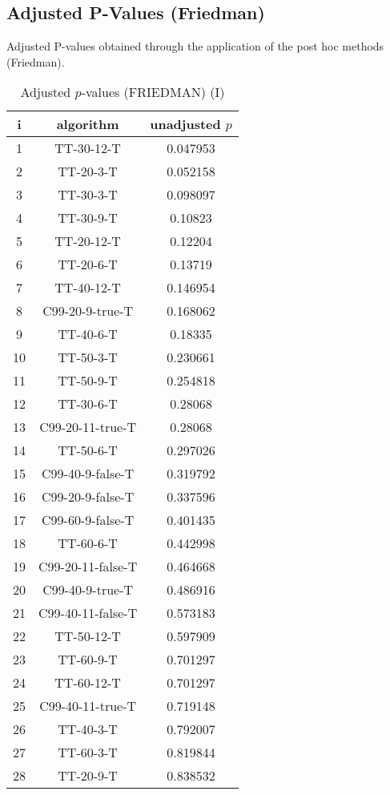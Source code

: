 \documentclass[a4paper,10pt]{article}
\begin{document}
\begin{landscape}
\section{Adjusted P-Values (Friedman)}


Adjusted P-values obtained through the application of the post hoc methods (Friedman).

\begin{table}[!htp]
\centering\small
\begin{tabular}{ccc}
i&algorithm&unadjusted $p$\\
\hline1&TT-30-12-T&0.047953\\2&TT-20-3-T&0.052158\\3&TT-30-3-T&0.098097\\4&TT-30-9-T&0.10823\\5&TT-20-12-T&0.12204\\6&TT-20-6-T&0.13719\\7&TT-40-12-T&0.146954\\8&C99-20-9-true-T&0.168062\\9&TT-40-6-T&0.18335\\10&TT-50-3-T&0.230661\\11&TT-50-9-T&0.254818\\12&TT-30-6-T&0.28068\\13&C99-20-11-true-T&0.28068\\14&TT-50-6-T&0.297026\\15&C99-40-9-false-T&0.319792\\16&C99-20-9-false-T&0.337596\\17&C99-60-9-false-T&0.401435\\18&TT-60-6-T&0.442998\\19&C99-20-11-false-T&0.464668\\20&C99-40-9-true-T&0.486916\\21&C99-40-11-false-T&0.573183\\22&TT-50-12-T&0.597909\\23&TT-60-9-T&0.701297\\24&TT-60-12-T&0.701297\\25&C99-40-11-true-T&0.719148\\26&TT-40-3-T&0.792007\\27&TT-60-3-T&0.819844\\28&TT-20-9-T&0.838532\\\hline
\end{tabular}
\caption{Adjusted $p$-values (FRIEDMAN) (I)}
\end{table}
\begin{table}[!htp]

\end{table}
\end{landscape}
\end{document}
